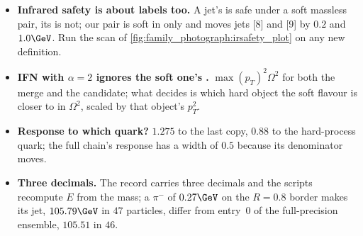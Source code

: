 \begin{pitfalls}
\begin{itemize}[nosep]
    $g\to b\bar b$ jet, the kind a tagger calibrated on single-$b$ jets
    misjudges; at $R=0.8$ it disappears into the $\bar b$'s jet, which
    then reads three B~hadrons.
  \item \textbf{Infrared safety is about labels too.} A jet's \pt is
    safe under a soft massless pair, its \hadflav is not; our pair is soft
    in \pt only and moves jets [8] and [9] by $0.2$ and $1.0\GeV$. Run
    the scan of \cref{fig:family_photograph:irsafety_plot} on any new
    definition.
  \item \textbf{IFN with $\alpha=2$ ignores the soft one's \pt.}
    $\max(p_T)^2\Omega^2$ for both the merge and the candidate; what
    decides is which hard object the soft flavour is closer to in
    $\Omega^2$, scaled by that object's $p_T^2$.
  \item \textbf{Response to which quark?} $1.275$ to the last copy,
    $0.88$ to the hard-process quark; the full chain's response has a
    width of $0.5$ because its denominator moves.
  \item \textbf{Three decimals.} The record carries three decimals and
    the scripts recompute $E$ from the mass; a $\pi^-$ of $0.27\GeV$ on
    the $R=0.8$ border makes its \akeight jet, $105.79\GeV$ in $47$
    particles, differ from entry~0 of the full-precision ensemble,
    $105.51$ in $46$.
\end{itemize}
\end{pitfalls}

